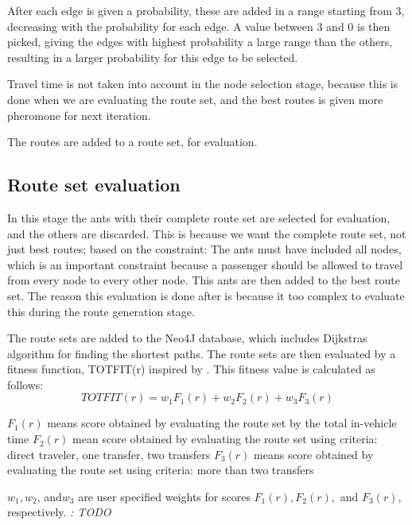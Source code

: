 After each edge is given a probability, these are added in a range starting from 3, decreasing with the probability for each edge. A value between 3 and 0 is then picked, giving the edges with highest probability a large range than the others, resulting in a larger probability for this edge to be selected. 

Travel time is not taken into account in the node selection stage, because this is done when we are evaluating the route set, and the best routes is given more pheromone for next iteration. %

The routes are added to a route set, for evaluation.


\subsection{Route set evaluation}
In this stage the ants with their complete route set are selected for evaluation, and the others are discarded. This is because we want the complete route set, not just best routes; based on the constraint: The ants must have included all nodes, which is an important constraint because a passenger should be allowed to travel from every node to every other node. 
This ants are then added to the best route set. The reason this evaluation is done after is because it too complex to evaluate this during the route generation stage. 

The route sets are added to the Neo4J database, which includes Dijkstras algorithm for finding the shortest paths. 
The route sets are then evaluated by a fitness function, TOTFIT(r) inspired by \citep{kechagiopoulos14}.
This fitness value is calculated as follows:
$$ TOTFIT(r) = w_{1}F_{1}(r) + w_{2}F_{2}(r) + w_{3}F_{3}(r)$$

$ F_{1}(r)$ means score obtained by evaluating the route set by the total in-vehicle time
$ F_{2}(r)$ mean score obtained by evaluating the route set using criteria: direct traveler, one transfer, two transfers
$ F_{3}(r)$ means score obtained by evaluating the route set using criteria: more than two transfers 

$ w_{1}, w_{2}$, and$ w_{3}$ are user specified weights for scores $ F_{1}(r), F_{2}(r),$ and $ F_{3}(r)$, respectively. \textit{: TODO}

